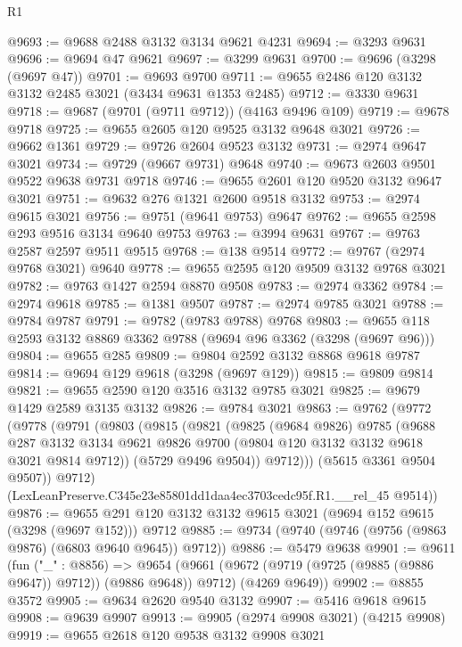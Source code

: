 \begin{lexlean}{R1}
\begin{coremodule}
@9693 := @9688 @2488 @3132 @3134 @9621 @4231
@9694 := @3293 @9631
@9696 := @9694 @47 @9621
@9697 := @3299 @9631
@9700 := @9696 (@3298 (@9697 @47))
@9701 := @9693 @9700
@9711 := @9655 @2486 @120 @3132 @3132 @2485 @3021 (@3434 @9631 @1353 @2485)
@9712 := @3330 @9631
@9718 := @9687 (@9701 (@9711 @9712)) (@4163 @9496 @109)
@9719 := @9678 @9718
@9725 := @9655 @2605 @120 @9525 @3132 @9648 @3021
@9726 := @9662 @1361
@9729 := @9726 @2604 @9523 @3132
@9731 := @2974 @9647 @3021
@9734 := @9729 (@9667 @9731) @9648
@9740 := @9673 @2603 @9501 @9522 @9638 @9731 @9718
@9746 := @9655 @2601 @120 @9520 @3132 @9647 @3021
@9751 := @9632 @276 @1321 @2600 @9518 @3132
@9753 := @2974 @9615 @3021
@9756 := @9751 (@9641 @9753) @9647
@9762 := @9655 @2598 @293 @9516 @3134 @9640 @9753
@9763 := @3994 @9631
@9767 := @9763 @2587 @2597 @9511 @9515
@9768 := @138 @9514
@9772 := @9767 (@2974 @9768 @3021) @9640
@9778 := @9655 @2595 @120 @9509 @3132 @9768 @3021
@9782 := @9763 @1427 @2594 @8870 @9508
@9783 := @2974 @3362
@9784 := @2974 @9618
@9785 := @1381 @9507
@9787 := @2974 @9785 @3021
@9788 := @9784 @9787
@9791 := @9782 (@9783 @9788) @9768
@9803 := @9655 @118 @2593 @3132 @8869 @3362 @9788 (@9694 @96 @3362 (@3298 (@9697 @96)))
@9804 := @9655 @285
@9809 := @9804 @2592 @3132 @8868 @9618 @9787
@9814 := @9694 @129 @9618 (@3298 (@9697 @129))
@9815 := @9809 @9814
@9821 := @9655 @2590 @120 @3516 @3132 @9785 @3021
@9825 := @9679 @1429 @2589 @3135 @3132
@9826 := @9784 @3021
@9863 := @9762
    (@9772
      (@9778
        (@9791
          (@9803
            (@9815
              (@9821
                (@9825
                  (@9684 @9826)
                  @9785
                  (@9688
                    @287
                    @3132
                    @3134
                    @9621
                    @9826
                    @9700
                    (@9804 @120 @3132 @3132 @9618 @3021 @9814 @9712))
                  (@5729 @9496 @9504))
                @9712)))
          (@5615 @3361 @9504 @9507))
        @9712)
      (LexLeanPreserve.C345e23e85801dd1daa4ec3703cedc95f.R1.__rel_45 @9514))
@9876 := @9655 @291 @120 @3132 @3132 @9615 @3021 (@9694 @152 @9615 (@3298 (@9697 @152))) @9712
@9885 := @9734 (@9740 (@9746 (@9756 (@9863 @9876) (@6803 @9640 @9645)) @9712))
@9886 := @5479 @9638
@9901 := @9611
    (fun ("_" : @8856) =>
    @9654
      (@9661 (@9672 (@9719 (@9725 (@9885 (@9886 @9647)) @9712)) (@9886 @9648)) @9712)
      (@4269 @9649))
@9902 := @8855 @3572
@9905 := @9634 @2620 @9540 @3132
@9907 := @5416 @9618 @9615
@9908 := @9639 @9907
@9913 := @9905 (@2974 @9908 @3021) (@4215 @9908)
@9919 := @9655 @2618 @120 @9538 @3132 @9908 @3021

\end{coremodule}
\end{lexlean}
